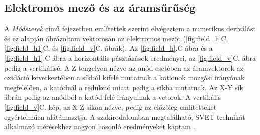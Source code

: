 \subsection{Elektromos mező és az áramsűrűség}
A \emph{Módszerek} című fejezetben említettek szerint elvégeztem a numerikus deriválást és ez alapján ábrázoltam vektorosan az elektromos mezőt (\ref{fig:field_h}C,  \ref{fig:field_h1}C, és \ref{fig:field_v}C. ábrák). Az \ref{fig:field_h}.C ábra és a \ref{fig:field_h1}.C ábra a horizontális pásztázások eredményei, az \ref{fig:field_v}C. ábra pedig a vertikálisé. A Z tengelyen nézve az anód esetében az áramvektorok az oxidáció következtében a síkból kifelé mutatnak a kationok mozgási irányának megfelelően, a katódnál a redukció miatt pedig a síkba mutatnak. Az X-Y sík ábrán pedig az anódból a katód felé irányulnak a vetorok. A vertikális \ref{fig:field_v}C. kép, az X-Z síkon nézve, pedig az előzőleg említetteket egyértelműen alátámasztja. A szakirodalomban megtalálható, SVET technikát alkalmazó mérésekhez nagyon hasonló eredményeket kaptam \cite{bastos2016preliminary}. 


